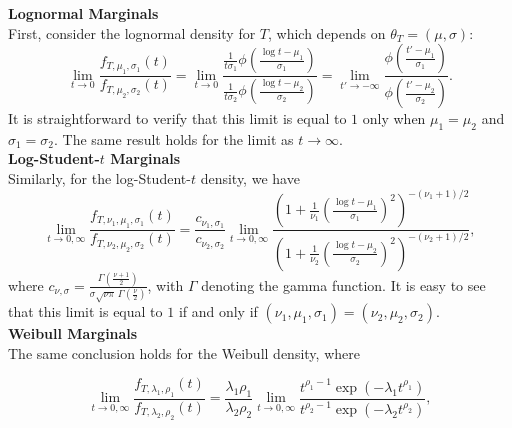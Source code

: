 \textbf{Lognormal Marginals}\\
First, consider the lognormal density for \( T \), which depends on \( \theta_T = (\mu, \sigma) \):
\[
\lim_{t \to 0} \frac{f_{T, \mu_1, \sigma_1}(t)}{f_{T, \mu_2, \sigma_2}(t)} = \lim_{t \to 0} \frac{\frac{1}{t \sigma_1} \phi\left(\frac{\log t - \mu_1}{\sigma_1}\right)}{\frac{1}{t \sigma_2} \phi\left(\frac{\log t - \mu_2}{\sigma_2}\right)} = \lim_{t' \to -\infty} \frac{\phi\left(\frac{t' - \mu_1}{\sigma_1}\right)}{\phi\left(\frac{t' - \mu_2}{\sigma_2}\right)}.
\]
It is straightforward to verify that this limit is equal to \(1\) only when \(\mu_1 = \mu_2\) and \(\sigma_1 = \sigma_2\). The same result holds for the limit as \(t \to \infty\).\\
\textbf{Log-Student-\(t\) Marginals}\\
Similarly, for the log-Student-\( t \) density, we have
\[
\lim_{t \to 0, \infty} \frac{f_{T, \nu_1, \mu_1, \sigma_1}(t)}{f_{T, \nu_2, \mu_2, \sigma_2}(t)} = \frac{c_{\nu_1, \sigma_1}}{c_{\nu_2, \sigma_2}} \lim_{t \to 0, \infty} \frac{\left(1 + \frac{1}{\nu_1} \left(\frac{\log t - \mu_1}{\sigma_1}\right)^2\right)^{-(\nu_1 + 1)/2}}{\left(1 + \frac{1}{\nu_2} \left(\frac{\log t - \mu_2}{\sigma_2}\right)^2\right)^{-(\nu_2 + 1)/2}},
\]
where \( c_{\nu, \sigma} = \frac{\Gamma\left(\frac{\nu + 1}{2}\right)}{\sigma \sqrt{\nu \pi} \, \Gamma\left(\frac{\nu}{2}\right)} \), with \(\Gamma\) denoting the gamma function. It is easy to see that this limit is equal to \(1\) if and only if \((\nu_1, \mu_1, \sigma_1) = (\nu_2, \mu_2, \sigma_2)\).\\
\textbf{Weibull Marginals}\\
The same conclusion holds for the Weibull density, where

\[
\lim_{t \to 0, \infty} \frac{f_{T, \lambda_1, \rho_1}(t)}{f_{T, \lambda_2, \rho_2}(t)} = \frac{\lambda_1 \rho_1}{\lambda_2 \rho_2} \lim_{t \to 0, \infty} \frac{t^{\rho_1 - 1} \exp(-\lambda_1 t^{\rho_1})}{t^{\rho_2 - 1} \exp(-\lambda_2 t^{\rho_2})},
\]

